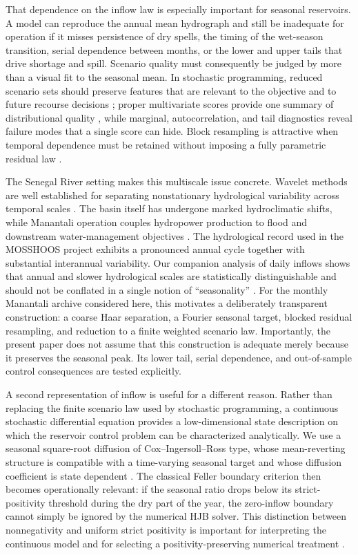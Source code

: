 \documentclass[11pt,a4paper]{article}
\begin{document}
That dependence on the inflow law is especially important for seasonal reservoirs.
A model can reproduce the annual mean hydrograph and still be inadequate for
operation if it misses persistence of dry spells, the timing of the wet-season
transition, serial dependence between months, or the lower and upper tails that
drive shortage and spill. Scenario quality must consequently be judged by more
than a visual fit to the seasonal mean. In stochastic programming, reduced
scenario sets should preserve features that are relevant to the objective and to
future recourse decisions \cite{heitsch2003,kaut2007}; proper multivariate scores
provide one summary of distributional quality \cite{gneiting2007}, while marginal,
autocorrelation, and tail diagnostics reveal failure modes that a single score can
hide. Block resampling is attractive when temporal dependence must be retained
without imposing a fully parametric residual law \cite{politis1994}.

The Senegal River setting makes this multiscale issue concrete. Wavelet methods
are well established for separating nonstationary hydrological variability across
temporal scales \cite{labat2005,sang2013}. The basin itself has undergone marked
hydroclimatic shifts, while Manantali operation couples hydropower production to
flood and downstream water-management objectives \cite{bodian2020,bruckmann2022,raso2020}.
The hydrological record used in the MOSSHOOS project exhibits a pronounced annual
cycle together with substantial interannual variability. Our companion analysis
of daily inflows shows that annual and slower hydrological scales are statistically
distinguishable and should not be conflated in a single notion of ``seasonality''
\cite{affognon2026wavelet}. For the monthly Manantali archive considered here,
this motivates a deliberately transparent construction: a coarse Haar separation,
a Fourier seasonal target, blocked residual resampling, and reduction to a finite
weighted scenario law. Importantly, the present paper does not assume that this
construction is adequate merely because it preserves the seasonal peak. Its lower
tail, serial dependence, and out-of-sample control consequences are tested
explicitly.

A second representation of inflow is useful for a different reason. Rather than
replacing the finite scenario law used by stochastic programming, a continuous
stochastic differential equation provides a low-dimensional state description on
which the reservoir control problem can be characterized analytically. We use a
seasonal square-root diffusion of Cox--Ingersoll--Ross type, whose mean-reverting
structure is compatible with a time-varying seasonal target and whose diffusion
coefficient is state dependent \cite{cir1985}. The classical Feller boundary
criterion \cite{feller1951} then becomes operationally relevant: if the seasonal
ratio drops below its strict-positivity threshold during the dry part of the year,
the zero-inflow boundary cannot simply be ignored by the numerical HJB solver.
This distinction between nonnegativity and uniform strict positivity is important
for interpreting the continuous model and for selecting a positivity-preserving
numerical treatment \cite{alfonsi2005,lord2010}.
\end{document}
